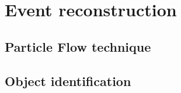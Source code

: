 
\section{Event reconstruction \label{sec:event_reconstruction}}




 

\subsection{Particle Flow technique \label{sec:event_reco_pf}}


\subsection{Object identification}

